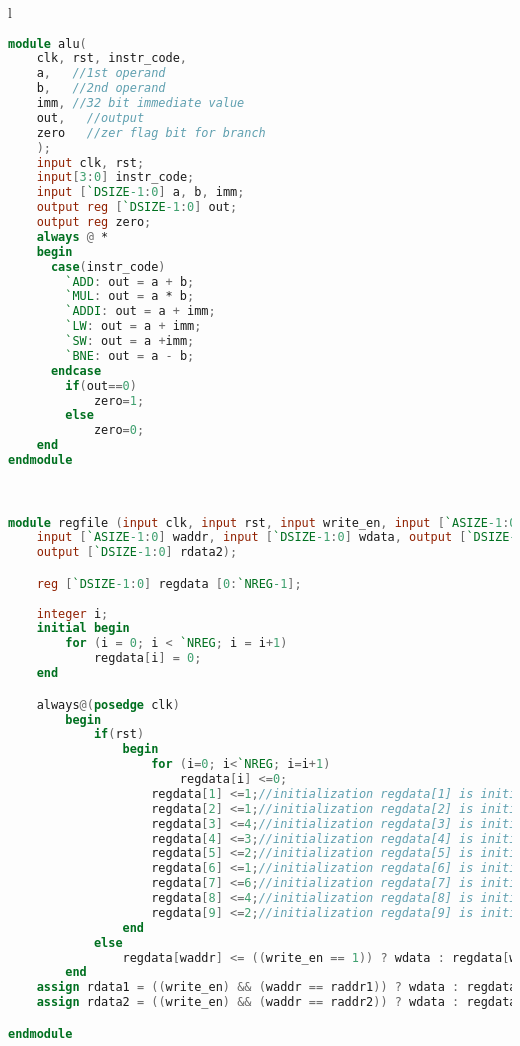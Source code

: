 \begin{table}[!h]
\centering
\caption{RISC-V Processor ALU and Register file}
\label{riscvcode4:alu_reg}
\begin{tabular}{l}
\toprule

\begin{lstlisting}[columns=fullflexible, language=Verilog]
module alu(
    clk, rst, instr_code,
    a,   //1st operand
    b,   //2nd operand
    imm, //32 bit immediate value
    out,   //output
  	zero   //zer flag bit for branch 
    );
    input clk, rst;
    input[3:0] instr_code;
    input [`DSIZE-1:0] a, b, imm;
    output reg [`DSIZE-1:0] out;
    output reg zero;      
    always @ * 
    begin
      case(instr_code)
        `ADD: out = a + b;
        `MUL: out = a * b;
        `ADDI: out = a + imm;
        `LW: out = a + imm;
        `SW: out = a +imm;
        `BNE: out = a - b;
      endcase    	
    	if(out==0)
    		zero=1;
    	else
    		zero=0;
    end
endmodule
\end{lstlisting}
\\
\midrule

\begin{lstlisting}[columns=fullflexible, language=Verilog]
module regfile (input clk, input rst, input write_en, input [`ASIZE-1:0] raddr1, input [`ASIZE-1:0] raddr2, 
	input [`ASIZE-1:0] waddr, input [`DSIZE-1:0] wdata, output [`DSIZE-1:0] rdata1, 
    output [`DSIZE-1:0] rdata2);

	reg [`DSIZE-1:0] regdata [0:`NREG-1];
	
	integer i;
	initial begin
		for (i = 0; i < `NREG; i = i+1)
			regdata[i] = 0;
	end

	always@(posedge clk)
		begin
			if(rst)
				begin
					for (i=0; i<`NREG; i=i+1)
						regdata[i] <=0;
					regdata[1] <=1;//initialization regdata[1] is initialized with 1.
					regdata[2] <=1;//initialization regdata[2] is initialized with 1.
					regdata[3] <=4;//initialization regdata[3] is initialized with 4.
					regdata[4] <=3;//initialization regdata[4] is initialized with 3.
					regdata[5] <=2;//initialization regdata[5] is initialized with 2.
					regdata[6] <=1;//initialization regdata[6] is initialized with 1.
					regdata[7] <=6;//initialization regdata[7] is initialized with 6.
					regdata[8] <=4;//initialization regdata[8] is initialized with 4.
					regdata[9] <=2;//initialization regdata[9] is initialized with 2.					
				end
			else
				regdata[waddr] <= ((write_en == 1)) ? wdata : regdata[waddr];
		end
	assign rdata1 = ((write_en) && (waddr == raddr1)) ? wdata : regdata[raddr1];
	assign rdata2 = ((write_en) && (waddr == raddr2)) ? wdata : regdata[raddr2];

endmodule
\end{lstlisting}
\\
\bottomrule
\end{tabular}
\end{table}

